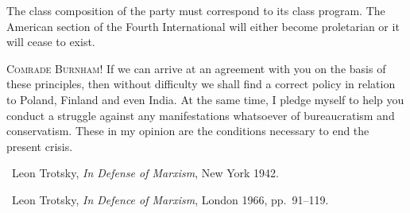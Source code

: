 The class composition of the party must correspond to its class program. The American section of the Fourth International will either become proletarian or it will cease to exist.

\triast

\noindent
\textsc{Comrade Burnham!} If we can arrive at an agreement with you on the basis of these principles, then without difficulty we shall find a correct policy in relation to Poland, Finland and even India. At the same time, I pledge myself to help you conduct a struggle against any manifestations whatsoever of bureaucratism and conservatism. These in my opinion are the conditions necessary to end the present crisis.

\enlargethispage{1 \baselineskip}


\begin{letterinfo}
	\firstpublished\ Leon Trotsky, \emph{In Defense of Marxism}, New York 1942.
	
	\checkedagainst\ Leon Trotsky, \emph{In Defence of Marxism}, London 1966, pp.~91--119.
\end{letterinfo}